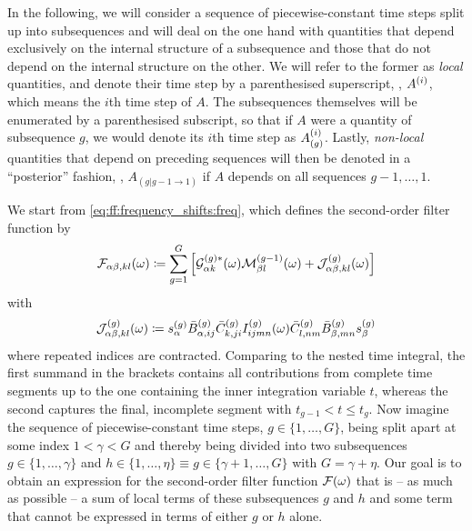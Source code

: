 In the following, we will consider a sequence of piecewise-constant time steps split up into subsequences and will deal on the one hand with quantities that depend exclusively on the internal structure of a subsequence and those that do not depend on the internal structure on the other.
We will refer to the former as \emph{local} quantities, and denote their time step by a parenthesised superscript, \eg, $A^{(i)}$, which means the $i$th time step of $A$.
The subsequences themselves will be enumerated by a parenthesised subscript, so that if $A$ were a quantity of subsequence $g$, we would denote its $i$th time step as $A_{(g)}^{(i)}$.
Lastly, \emph{non-local} quantities that depend on preceding sequences will then be denoted in a \enquote{posterior} fashion, \eg, $A_{(g|g-1\to 1)}$ if $A$ depends on all sequences $g-1, \dotsc, 1$.

We start from \cref{eq:ff:frequency_shifts:freq}, which defines the second-order filter function by
\begin{equation}\label{eq:app:ff:filter_function:complete}
    \mathcal{F}_{\alpha\beta,kl}(\omega) \coloneqq \sum_{g=1}^{G}\left[
        \mathcal{G}_{\alpha k}^{(g)\ast}(\omega) \mathcal{M}_{\beta l}^{(g-1)}(\omega) + \mathcal{J}_{\alpha\beta,kl}^{(g)}(\omega)
    \right]
\end{equation}
with
\begin{equation}\label{eq:app:ff:nested_time_step}
    \mathcal{J}_{\alpha\beta,kl}^{(g)}(\omega) \coloneqq s_\alpha^{(g)}\bar{B}_{\alpha,ij}^{(g)}\bar{C}_{k,ji}^{(g)} I_{ijmn}^{(g)}(\omega)\bar{C}_{l,nm}^{(g)}\bar{B}_{\beta,mn}^{(g)} s_\beta^{(g)}
\end{equation}
where repeated indices are contracted.
Comparing to the nested time integral, the first summand in the brackets contains all contributions from complete time segments up to the one containing the inner integration variable $t$, whereas the second captures the final, incomplete segment with $t_{g-1} < t \leq t_{g}$.
Now imagine the sequence of piecewise-constant time steps, $g\in\{1,\dotsc,G\}$, being split apart at some index $1<\gamma<G$ and thereby being divided into two subsequences $g\in\{1,\dotsc,\gamma\}$ and $h\in\{1,\dotsc,\eta\} \equiv g\in\{\gamma+1,\dotsc,G\}$ with $G = \gamma + \eta$.
Our goal is to obtain an expression for the second-order filter function $\mathcal{F}(\omega)$ that is -- as much as possible -- a sum of local terms of these subsequences $g$ and $h$ and some term that cannot be expressed in terms of either $g$ or $h$ alone.

